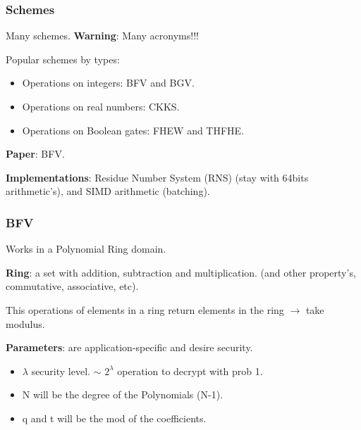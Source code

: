 \documentclass[10pt,handout]{beamer}
\begin{document}


\begin{frame}
    \frametitle{Schemes}

    Many schemes. \textbf{Warning}: Many acronyms!!!

    Popular schemes by types:
    \begin{itemize}
        \item Operations on integers: BFV and BGV.
        \item Operations on real numbers: CKKS.
        \item Operations on Boolean gates: FHEW and THFHE.
    \end{itemize}

    \textbf{Paper}: BFV.

    \textbf{Implementations}: Residue Number System (RNS) (stay with 64bits arithmetic's), and SIMD arithmetic (batching).

\end{frame}



\begin{frame}
    \frametitle{BFV}

Works in a Polynomial Ring domain.

\textbf{Ring}: a set with addition, subtraction and multiplication. (and other property's, commutative, associative, etc).

This operations of elements in a ring return elements in the ring $\rightarrow$ take modulus.

\textbf{Parameters}: are application-specific and desire security.

\begin{itemize}
    \item $\lambda$ security level. $\sim$ $2^\lambda$ operation to decrypt with prob 1.
    \item N will be the degree of the Polynomials (N-1).
    \item q and t will be the mod of the coefficients.
\end{itemize}


\end{frame}


\end{document}
